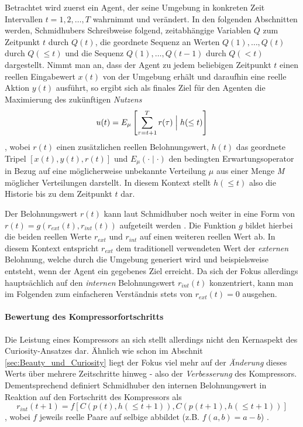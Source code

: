 Betrachtet wird zuerst ein Agent, der seine Umgebung in konkreten Zeit Intervallen \(t = 1,2, \dots ,T\) wahrnimmt und verändert. 
In den folgenden Abschnitten werden, Schmidhubers Schreibweise folgend, zeitabhängige Variablen \(Q\) zum Zeitpunkt \(t\) durch \(Q(t)\), die geordnete Sequenz an Werten \(Q(1), \dots,Q(t)\) durch \(Q(\leq t)\) und die Sequenz \(Q(1), \dots, Q(t-1)\) durch \(Q(<t)\) dargestellt.
Nimmt man an, dass der Agent zu jedem beliebigen Zeitpunkt \(t\) einen reellen Eingabewert \(x(t)\) von der Umgebung erhält und daraufhin eine reelle Aktion \(y(t)\) ausführt, so ergibt sich als finales Ziel für den Agenten die Maximierung des zukünftigen \emph{Nutzens} 
\begin{equation} \label{eq:objective_curiosity}
  u(t) = E_\mu \left[ \sum^T_{\tau=t+1} r(\tau) \Bigm\vert h(\leq t)\right]  
\end{equation}
, wobei \(r(t)\) einen zusätzlichen reellen Belohnungswert, \(h(t)\) das geordnete Tripel \(\left[ x(t),y(t),r(t)\right]\) und \(E_\mu(\cdot \mid \cdot)\) den bedingten Erwartungsoperator in Bezug auf eine möglicherweise unbekannte Verteilung \(\mu\) aus einer Menge \emph{M} möglicher Verteilungen darstellt. \cite[p.~17]{curiosity_schmidhuber}
In diesem Kontext stellt \(h(\leq t)\) also die Historie bis zu dem Zeitpunkt \(t\) dar.

Der Belohnungswert \(r(t)\) kann laut Schmidhuber noch weiter in eine Form von \(r(t) = g(r_{ext}(t),r_{int}(t))\) aufgeteilt werden \cite{curiosity_schmidhuber}.
Die Funktion \(g\) bildet hierbei die beiden reellen Werte \(r_{ext}\) und \(r_{int}\) auf einen weiteren reellen Wert ab. In diesem Kontext entspricht \(r_{ext}\) dem traditionell verwendeten Wert der \emph{externen} Belohnung, welche durch die Umgebung generiert wird und beispielsweise entsteht, wenn der Agent ein gegebenes Ziel erreicht. 
Da sich der Fokus allerdings hauptsächlich auf den \emph{internen} Belohnungswert \(r_{int}(t)\) konzentriert, kann man im Folgenden zum einfacheren Verständnis stets von \(r_{ext}(t) = 0\) ausgehen.

\paragraph{Bewertung des Kompressorfortschritts}
Die Leistung eines Kompressors an sich stellt allerdings nicht den Kernaspekt des Curiosity-Ansatzes dar. Ähnlich wie schon im Abschnit \ref{sec:Beauty_und_Curiosity} liegt der Fokus viel mehr auf der \emph{Änderung} dieses Werts über mehrere Zeitschritte hinweg - also der \emph{Verbesserung} des Kompressors.
Dementsprechend definiert Schmidhuber den internen Belohnungswert in Reaktion auf den Fortschritt des Kompressors als 
\begin{equation}
  r_{int}(t+1) = f\left[C(p(t),h(\leq t+1)), C(p(t+1),h(\leq t+1))\right]  
\end{equation}
, wobei \(f\) jeweils reelle Paare auf selbige abbildet (z.B. \(f(a,b) = a - b\)) \cite[p.~19]{curiosity_schmidhuber}.

